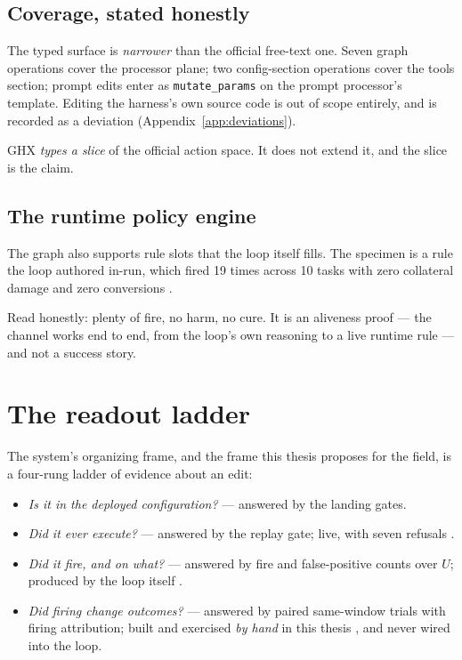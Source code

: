 \subsection*{Coverage, stated honestly}

The typed surface is \emph{narrower} than the official free-text one. Seven
graph operations cover the processor plane; two config-section operations
cover the tools section; prompt edits enter as \texttt{mutate\_params} on
the prompt processor's template. Editing the harness's own source code is
out of scope entirely, and is recorded as a deviation
(Appendix~\ref{app:deviations}).

GHX \emph{types a slice} of the official action space. It does not extend
it, and the slice is the claim.

\subsection*{The runtime policy engine}

The graph also supports rule slots that the loop itself fills. The specimen
is a rule the loop authored in-run, which fired 19 times across 10 tasks
with zero collateral damage and zero conversions .

Read honestly: plenty of fire, no harm, no cure. It is an aliveness proof
--- the channel works end to end, from the loop's own reasoning to a live
runtime rule --- and not a success story.

\section{The readout ladder}
\label{sec:ladder}

The system's organizing frame, and the frame this thesis proposes for the
field, is a four-rung ladder of evidence about an edit:

\begin{itemize}
  \item[\textbf{L0}] \emph{Is it in the deployed configuration?} ---
        answered by the landing gates.
  \item[\textbf{L1}] \emph{Did it ever execute?} --- answered by the replay
        gate; live, with seven refusals .
  \item[\textbf{L2}] \emph{Did it fire, and on what?} --- answered by fire
        and false-positive counts over $U$; produced by the loop itself
        .
  \item[\textbf{L3}] \emph{Did firing change outcomes?} --- answered by
        paired same-window trials with firing attribution; built and
        exercised \emph{by hand} in this thesis , and never
        wired into the loop.
\end{itemize}

